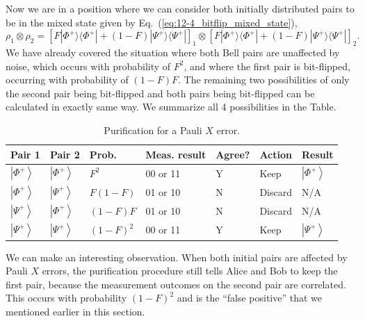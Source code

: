 Now we are in a position where we can consider both initially distributed pairs to be in the mixed state given by Eq.~(\ref{eq:12-4_bitflip_mixed_state}),
\begin{equation}
    \rho_1 \otimes \rho_2 = \left[ F |\Phi^+\rangle \langle\Phi^+| + (1 - F) |\Psi^+\rangle \langle\Psi^+| \right]_1 \otimes \left[ F |\Phi^+\rangle \langle\Phi^+| + (1 - F) |\Psi^+\rangle \langle\Psi^+| \right]_2.
\end{equation}
We have already covered the situation where both Bell pairs are unaffected by noise, which occurs with probability of $F^2$, and where the first pair is bit-flipped, occurring with probability of $(1-F)F$.
The remaining two possibilities of only the second pair being bit-flipped and both pairs being bit-flipped can be calculated in exactly same way.
We summarize all 4 possibilities in the Table.
\begin{table}[t]
    \centering
    \begin{tabular}{|l|l|l|l|l|l|l|}
        \hline Pair 1 & Pair 2 & Prob. & Meas. result & Agree? & Action & Result \\
        \hline$\left|\Phi^{+}\right\rangle$ & $\left|\Phi^{+}\right\rangle$ & $F^{2}$ & 00 or 11 & Y & Keep & $\left|\Phi^{+}\right\rangle$ \\
        \hline$\left|\Phi^{+}\right\rangle$ & $\left|\Psi^{+}\right\rangle$ & $F(1-F)$ & 01 or 10 & N & Discard & N/A \\
        \hline$\left|\Psi^{+}\right\rangle$ & $\left|\Phi^{+}\right\rangle$ & $(1-F) F$ & 01 or 10 & N & Discard & N/A \\
        \hline$\left|\Psi^{+}\right\rangle$ & $\left|\Psi^{+}\right\rangle$ & $(1-F)^{2}$ & 00 or 11 & Y & Keep & $\left|\Psi^{+}\right\rangle$ \\
        \hline
    \end{tabular}
    \caption[X error purification]{Purification for a Pauli $X$ error.}
    \label{tab:12-4_purification_X_error}
\end{table}
We can make an interesting observation.
When both initial pairs are affected by Pauli $X$ errors, the purification procedure still tells Alice and Bob to keep the first pair, because the measurement outcomes on the second pair are correlated.
This occurs with probability $(1-F)^2$ and is the ``false positive'' that we mentioned earlier in this section.

